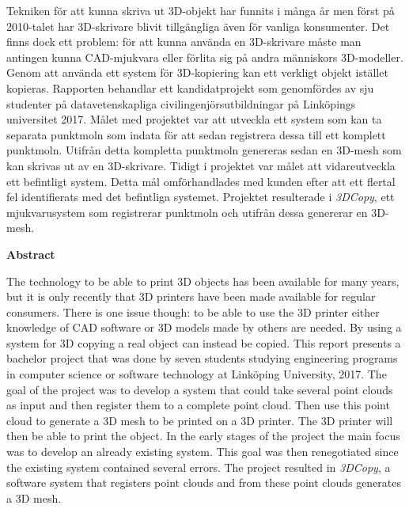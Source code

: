 \noindent
Tekniken för att kunna skriva ut 3D-objekt har funnits i många år men först på 2010-talet har 3D-skrivare blivit tillgängliga även för vanliga konsumenter. Det finns dock ett problem: för att kunna använda en 3D-skrivare måste man antingen kunna CAD-mjukvara eller förlita sig på andra människors 3D-modeller. Genom att använda ett system för 3D-kopiering kan ett verkligt objekt istället kopieras. Rapporten behandlar ett kandidatprojekt som genomfördes av sju studenter på datavetenskapliga civilingenjörsutbildningar på Linköpings universitet 2017. Målet med projektet var att utveckla ett system som kan ta separata punktmoln som indata för att sedan registrera dessa till ett komplett punktmoln. Utifrån detta kompletta punktmoln genereras sedan en 3D-mesh som kan skrivas ut av en 3D-skrivare. Tidigt i projektet var målet att vidareutveckla ett befintligt system. Detta mål omförhandlades med kunden efter att ett flertal fel identifierats med det befintliga systemet. Projektet resulterade i \textit{3DCopy}, ett mjukvarusystem som registrerar punktmoln och utifrån dessa genererar en 3D-mesh.
\bigskip

\begin{center}
\textbf{Abstract}
\end{center}

\noindent
The technology to be able to print 3D objects has been available for many years, but it is only recently that 3D printers have been made available for regular consumers. There is one issue though: to be able to use the 3D printer either knowledge of CAD software or 3D models made by others are needed. By using a system for 3D copying a real object can instead be copied. This report presents a bachelor project that was done by seven students studying engineering programs in computer science or software technology at Linköping University, 2017. The goal of the project was to develop a system that could take several point clouds as input and then register them to a complete point cloud. Then use this point cloud to generate a 3D mesh to be printed on a 3D printer. The 3D printer will then be able to print the object. In the early stages of the project the main focus was to develop an already existing system. This goal was then renegotiated since the existing system contained several errors. The project resulted in \textit{3DCopy}, a software system that registers point clouds and from these point clouds generates a 3D mesh.

